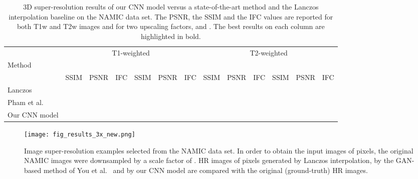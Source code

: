 \documentclass{ieeeaccess}
\begin{document}
\begin{table*}[!t]
\caption{3D super-resolution results of our CNN model versus a state-of-the-art method \cite{Pham-CMIG-2019} and the Lanczos interpolation baseline on the NAMIC data set. The PSNR, the SSIM and the IFC values are reported for both T1w and T2w images and for two upscaling factors,  and . The best results on each column are highlighted in bold.}\label{tab_namic_results_3D}
\begin{center}
\begin{tabular}{|l|c|c|c|c|c|c|c|c|c|c|c|c|}
\hline 
  & \multicolumn{6}{|c|}{T1-weighted} & \multicolumn{6}{|c|}{T2-weighted} \\
\cline{2-13}
Method        & \multicolumn{3}{|c|}{} & \multicolumn{3}{|c|}{} & \multicolumn{3}{|c|}{} & \multicolumn{3}{|c|}{} \\
\cline{2-13}   												& SSIM         & PSNR      & IFC			& SSIM        & PSNR & IFC    & SSIM           & PSNR & IFC          & SSIM           & PSNR & IFC\\
\hline  
\hline   
Lanczos               								&  &  &  &  &  &  &  &  &  &  &  & \\
\hline
Pham et al.~\cite{Pham-CMIG-2019}  &   &  &   &  &   &    &  &  &   &  &  & \\
\hline 
Our CNN model            						&  &  &  &  &  &  &  &  &  &  &  & \\ 
\hline 
\end{tabular}
\end{center}
\end{table*}

\begin{figure*}[t!]
\centering
\texttt{[image: fig\_results\_3x\_new.png]}
\caption{Image super-resolution examples selected from the NAMIC data set. In order to obtain the input images of  pixels, the original NAMIC images were downsampled by a scale factor of . HR images of  pixels generated by Lanczos interpolation, by the GAN-based method of You et al.~\cite{You-TMI-2019} and by our CNN model are compared with the original (ground-truth) HR images.}
\label{fig_namic_results}
\end{figure*}
\end{document}
